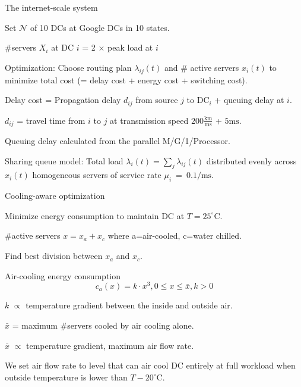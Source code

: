 \documentclass[xcolor=dvipsnames]{beamer}
\begin{document}
\begin{frame}{The internet-scale system}

Set $\mathcal{N}$ of 10 DCs at Google DCs in 10 states. \vspace{1mm}  %

\#servers $X_i$ at DC $i$ = 2 $\times$ peak load at $i$  \vspace{1mm} 


Optimization: Choose routing plan $\lambda_{ij}(t)$ and \# active servers $x_i(t)$  to minimize total cost (= delay cost + energy cost + switching cost).

\begin{block}{Delay cost}
= Propagation delay $d_{ij}$ from source $j$ to DC$_i$  + queuing delay at $i$.

$d_{ij}$ = travel time from $i$ to $j$ at transmission speed $200 \frac{\mathrm{km}}{\mathrm{ms}}$ + $5 \mathrm{ms}$. \vspace{1mm} 

Queuing delay calculated from the parallel M/G/1/Processor.  \vspace{1mm} 

Sharing queue model: Total load $\lambda_i(t)=\sum_j \lambda_{ij}(t)$ distributed evenly across $x_i(t)$ homogeneous servers of service rate \mbox{$\mu_i$ = $0.1 / \mathrm{ms}$}.

\end{block}

\end{frame}

\begin{frame}{Cooling-aware optimization}

	Minimize energy consumption to maintain DC at $T = 25^{\circ}\textrm{C}$. 

	\#active servers $x = x_a + x_c$  where a=air-cooled, c=water chilled. \vspace{1mm} 

	Find best division between $x_a$ and $x_c$.

	\begin{block}{Air-cooling energy consumption} \vspace{-3mm}
	\begin{equation}
           c_a(x) = k \cdot x^3, 0 \leq x \leq \bar{x}, k > 0
 	\end{equation}

 $k$ $\propto$ temperature gradient between the inside and outside air. 

$\bar{x}$ = maximum \#servers cooled by air cooling alone. 

$\bar{x}$ $\propto$ temperature gradient, maximum air flow rate. 

\vspace{2mm}

We set air flow rate to level that can air cool DC entirely at full workload when outside temperature is lower than   $T - 20^{\circ}\mathrm{C}$. 
\end{block}
\end{frame}
\end{document}
